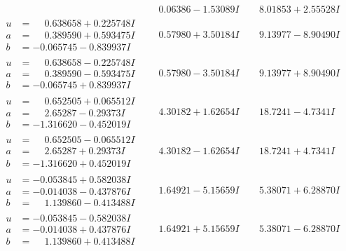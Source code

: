 \documentclass[1p]{elsarticle_modified}
\theoremstyle{definition}
\begin{document}
$$\begin{array}{c|c|c}
 & \phantom{-}0.06386 - 1.53089 I & \phantom{-}8.01853 + 2.55528 I \\ \hline\begin{aligned}
u &= \phantom{-}0.638658 + 0.225748 I \\
a &= \phantom{-}0.389590 + 0.593475 I \\
b &= -0.065745 - 0.839937 I\end{aligned}
 & \phantom{-}0.57980 + 3.50184 I & \phantom{-}9.13977 - 8.90490 I \\ \hline\begin{aligned}
u &= \phantom{-}0.638658 - 0.225748 I \\
a &= \phantom{-}0.389590 - 0.593475 I \\
b &= -0.065745 + 0.839937 I\end{aligned}
 & \phantom{-}0.57980 - 3.50184 I & \phantom{-}9.13977 + 8.90490 I \\ \hline\begin{aligned}
u &= \phantom{-}0.652505 + 0.065512 I \\
a &= \phantom{-}2.65287 - 0.29373 I \\
b &= -1.316620 - 0.452019 I\end{aligned}
 & \phantom{-}4.30182 + 1.62654 I & \phantom{-}18.7241 - 4.7341 I \\ \hline\begin{aligned}
u &= \phantom{-}0.652505 - 0.065512 I \\
a &= \phantom{-}2.65287 + 0.29373 I \\
b &= -1.316620 + 0.452019 I\end{aligned}
 & \phantom{-}4.30182 - 1.62654 I & \phantom{-}18.7241 + 4.7341 I \\ \hline\begin{aligned}
u &= -0.053845 + 0.582038 I \\
a &= -0.014038 - 0.437876 I \\
b &= \phantom{-}1.139860 - 0.413488 I\end{aligned}
 & \phantom{-}1.64921 - 5.15659 I & \phantom{-}5.38071 + 6.28870 I \\ \hline\begin{aligned}
u &= -0.053845 - 0.582038 I \\
a &= -0.014038 + 0.437876 I \\
b &= \phantom{-}1.139860 + 0.413488 I\end{aligned}
 & \phantom{-}1.64921 + 5.15659 I & \phantom{-}5.38071 - 6.28870 I \\ \hline\begin{aligned}

\end{aligned}
\end{array}$$
\end{document}
